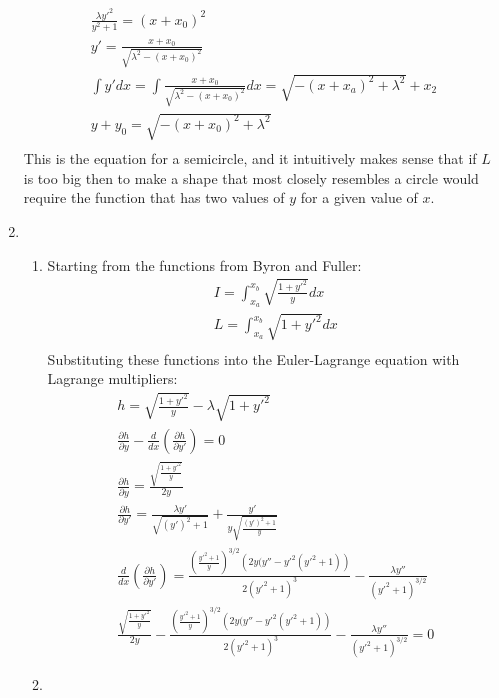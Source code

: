 \documentclass[12pt]{article}
\begin{document}
\begin{enumerate}
\begin{gather*}
            \frac{\lambda  y'^2}{y^2+1}=\left(x+x_0\right)^2\\
            y'=\frac{x+x_0}{\sqrt{\lambda^2-(x+x_0)^2}}\\
            \int y' dx=\int \frac{x+x_0}{\sqrt{\lambda^2-(x+x_0)^2}}dx=\sqrt{-(x+x_a)^2+\lambda^2}+x_2\\
            y+y_0=\sqrt{-(x+x_0)^2+\lambda^2}\\
        \end{gather*}
        This is the equation for a semicircle, and it intuitively makes sense that if $L$ is too big then to make a shape that most closely resembles a circle would require the function that has two values of $y$ for a given value of $x$.
        \item
        \begin{enumerate}
            \item
            Starting from the functions from Byron and Fuller:
            \begin{gather*}
                I=\int_{x_a}^{x_b}\sqrt{\frac{1+y'^2}{y}}dx\\
                L=\int_{x_a}^{x_b}\sqrt{1+y'^2}dx\\
            \end{gather*}
            Substituting these functions into the Euler-Lagrange equation with Lagrange multipliers:
            \begin{gather*}
                h=\sqrt{\frac{1+y'^2}{y}}-\lambda\sqrt{1+y'^2}\\
                \frac{\partial h}{\partial y}-\frac{d}{dx}\left(\frac{\partial h}{\partial y'}\right)=0\\
                \frac{\partial h}{\partial y}=\frac{\sqrt{\frac{1+y'^2}{y}}}{2 y}\\
                \frac{\partial h}{\partial y'}=\frac{\lambda  y'}{\sqrt{\left(y'\right)^2+1}}+\frac{y'}{y \sqrt{\frac{\left(y'\right)^2+1}{y}}}\\
                \frac{d}{dx}\left(\frac{\partial h}{\partial y'}\right)=\frac{\left(\frac{y'^2+1}{y}\right)^{3/2} \left(2 y( y''-y'^2 \left(y'^2+1\right)\right)}{2 \left(y'^2+1\right)^3}-\frac{\lambda  y''}{\left(y'^2+1\right)^{3/2}}\\
                \frac{\sqrt{\frac{1+y'^2}{y}}}{2 y}-\frac{\left(\frac{y'^2+1}{y}\right)^{3/2} \left(2 y( y''-y'^2 \left(y'^2+1\right)\right)}{2 \left(y'^2+1\right)^3}-\frac{\lambda  y''}{\left(y'^2+1\right)^{3/2}}=0
            \end{gather*}
            \item

\end{enumerate}
\end{enumerate}
\end{document}
